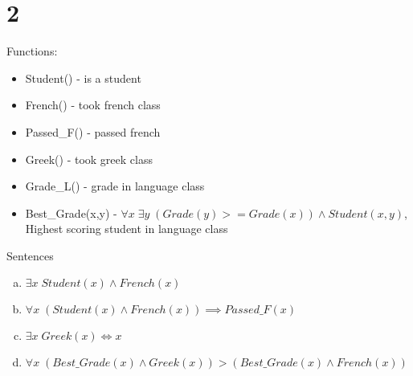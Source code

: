 \documentclass{article}
\begin{document}
    \section*{2}

    Functions:
    \begin{itemize}
        \item Student() - is a student
        \item French() - took french class
        \item Passed\_F() - passed french
        \item Greek() - took greek class
        \item Grade\_L() - grade in language class
        \item Best\_Grade(x,y) - $\forall x \; \exists y\; (Grade(y) >= Grade(x)) \land Student(x,y)$, Highest scoring student in language class
    \end{itemize}

    Sentences 
    \begin{enumerate}[a)]
      
        \item $\exists x\; Student(x) \land French(x)$
        \item $\forall x\; (Student(x) \land French(x)) \implies Passed\_F(x)$
        \item $\exists x\; Greek(x) \iff x$
        \item $\forall x \; (Best\_Grade(x) \land Greek(x)) > (Best\_Grade(x) \land French(x))$

      
    \end{enumerate}
\end{document}

